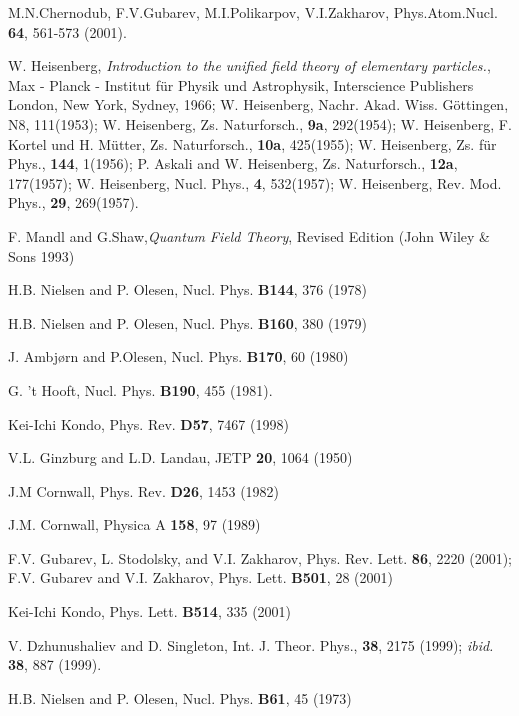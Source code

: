 \documentclass[a4paper,aps,showpacs]{revtex4}
\begin{document}
\begin{thebibliography}{99}

M.N.Chernodub, F.V.Gubarev, M.I.Polikarpov, V.I.Zakharov,
Phys.Atom.Nucl. \textbf{64},  561-573 (2001).

W. Heisenberg, \textit{Introduction to the unified field theory of
elementary particles.}, Max - Planck - Institut f\"ur Physik und
Astrophysik, Interscience Publishers London, New York, Sydney,
1966; W. Heisenberg, Nachr. Akad. Wiss. G\"ottingen, N8,
111(1953); W. Heisenberg, Zs. Naturforsch., \textbf{9a},
292(1954); W. Heisenberg, F. Kortel und H. M\"utter, Zs.
Naturforsch., \textbf{10a}, 425(1955); W. Heisenberg, Zs. f\"ur
Phys., \textbf{144}, 1(1956); P. Askali and W. Heisenberg, Zs.
Naturforsch., \textbf{12a}, 177(1957); W. Heisenberg, Nucl. Phys.,
\textbf{4}, 532(1957); W. Heisenberg, Rev. Mod. Phys., \textbf{29},
269(1957).

 F. Mandl and G.Shaw,{\it Quantum Field Theory},
Revised Edition (John Wiley \& Sons 1993)

 H.B. Nielsen and P. Olesen, Nucl. Phys. \textbf{B144},
376 (1978) 

 H.B. Nielsen and P. Olesen, Nucl. Phys. \textbf{B160},
380 (1979)

 J. Ambj{\o}rn and P.Olesen, Nucl. Phys. \textbf{B170},
60 (1980)

 G. 't Hooft, Nucl. Phys. \textbf{B190}, 455 (1981).

 Kei-Ichi Kondo, Phys. Rev. \textbf{D57}, 7467 (1998)

 V.L. Ginzburg and L.D. Landau, JETP \textbf{20},
1064 (1950)

 J.M Cornwall, Phys. Rev. \textbf{D26}, 1453 (1982)

 J.M. Cornwall, Physica A \textbf{158}, 97 (1989)

 F.V. Gubarev, L. Stodolsky, and V.I. Zakharov,
Phys. Rev. Lett. \textbf{86}, 2220 (2001); F.V. Gubarev and V.I. Zakharov,
Phys. Lett. \textbf{B501}, 28 (2001)

 Kei-Ichi Kondo, Phys. Lett. \textbf{B514}, 335 (2001)

 V. Dzhunushaliev and D. Singleton, Int. J. Theor. Phys.,
\textbf{38}, 2175 (1999); \textit{ibid.} \textbf{38}, 887 (1999).

 H.B. Nielsen and P. Olesen, Nucl. Phys. \textbf{B61}, 45 (1973)

\end{thebibliography}
\end{document}
